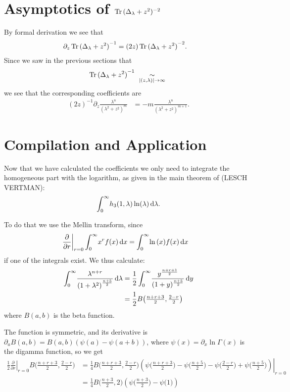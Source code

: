 \section{Asymptotics of $\Tr{(\Delta_\lambda + z^2)^{-2}}$}
By formal derivation we see that
\begin{align*}
    \partial_z\Tr{(\Delta_\lambda + z^2)}^{-1} &=
        (2z) \Tr{(\Delta_\lambda + z^2)}^{-2}.
\end{align*}
Since we saw in the previous sections that
\begin{align*}
    \Tr{(\Delta_\lambda + z^2)}^{-1}
    \ \SimAs{\Abs{(z,\lambda)}\to\infty}\ 
\end{align*}
we see that the corresponding coefficients are
\begin{align}
  (2z)^{-1} \partial_z \frac{\lambda^n}{(\lambda^2 + z^2)^{m}}
    &= -m \frac{\lambda^n}{(\lambda^2 + z^2)^{m+1}}.
\end{align}

\section{Compilation and Application}
Now that we have calculated the coefficients we only need to integrate the
homogeneous part with the logarithm, as given in the main theorem of (LESCH
VERTMAN):
\begin{align*}
  \Integ[\infty]{0}{\lambda}{h_3(1,\lambda)\ln(\lambda)}.
\end{align*}

To do that we use the Mellin transform, since
\begin{align*}
    \left.\frac\partial{\partial r}\right|_{r=0}\Integ[\infty]{0}{x}{x^r f(x)}
    &= \Integ[\infty]{0}{x}{\ln{(x)} f(x)}
\end{align*}
if one of the integrals exist. We thus calculate:
\begin{align*}
    \Integ[\infty]{0}{\lambda}{\frac{\lambda^{n + r}}{\left(1 +
    \lambda^2\right)^{\frac{n+5}{2}}}} &=
    \frac12\Integ[\infty]{0}{y}{\frac{y^{\frac{n+r+1}{2}}}{(1 +
    y)^{\frac{n+5}{2}}}} \\
    &= \frac12 B\bigl(\tfrac{n+r+3}{2}, \tfrac{2-r}{2}\bigr)
\end{align*}
where $B(a,b)$ is the beta function. %

The function is symmetric, and its
derivative is $\partial_a B(a,b) = B(a,b) (\psi(a) - \psi(a+b))$, where
$\psi(x) = \partial_x \ln\Gamma(x)$ is the digamma function, so we get
\begin{align*}
    \left.\frac12\frac\partial{\partial r}\right|_{r=0} B\bigl(\tfrac{n+r+3}{2},
    \tfrac{2-r}{2}\bigr)
    &= \left.\frac14 B\bigl(\tfrac{n+r+3}{2}, \tfrac{2-r}{2}\bigr)
    \left(\psi\bigl(\tfrac{n+r+3}{2}\bigr) - \psi\bigl(\tfrac{n+5}{2}\bigr) -
    \psi\bigl(\tfrac{2-r}{2}\bigr) +
    \psi\bigl(\tfrac{n+5}{2}\bigr)\right)\right|_{r=0} \\
    &= \frac14 B\bigl(\tfrac{n+3}{2}, 2\bigr)
    \left(\psi\bigl(\tfrac{n+3}{2}\bigr) - \psi\bigl(1\bigr)\right)
\end{align*}

